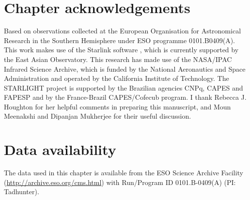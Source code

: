 \section*{Chapter acknowledgements}
\label{section: xshooter_ic5063: acknowledgements}

Based on observations collected at the European Organisation for Astronomical Research in the Southern Hemisphere under ESO programme 0101.B0409(A). This work makes use of the Starlink software \citep{Currie2014}, which is currently supported by the East Asian Observatory. This research has made use of the NASA/IPAC Infrared Science Archive, which is funded by the National Aeronautics and Space Administration and operated by the California Institute of Technology. The STARLIGHT project is supported by the Brazilian agencies CNPq, CAPES and FAPESP and by the France-Brazil CAPES/Cofecub program. I thank Rebecca J. Houghton for her helpful comments in preparing this manuscript, and Moun Meenakshi and Dipanjan Mukherjee for their useful discussion.

\section*{Data availability}

The data used in this chapter is available from the ESO Science Archive Facility (\url{http://archive.eso.org/cms.html}) with Run/Program ID 0101.B-0409(A) (PI: Tadhunter).
